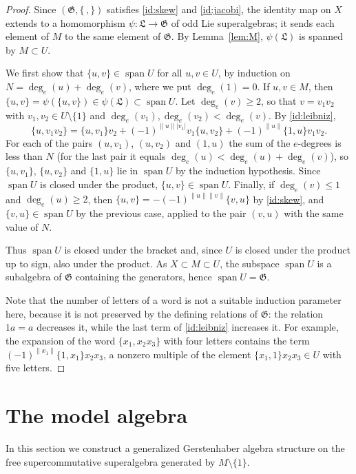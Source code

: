 \documentclass[11pt,reqno]{amsart}
\newcommand{\G}{\mathfrak G}
\newcommand{\LL}{\mathfrak L}
\newcommand{\rp}[1]{\|#1\|}
\DeclareMathOperator{\spn}{span}
\theoremstyle{plain}
\theoremstyle{definition}
\theoremstyle{remark}
\begin{document}
\begin{proof}
Since $(\G,\{\,,\})$ satisfies \eqref{id:skew} and \eqref{id:jacobi}, the identity map on $X$ extends to a homomorphism $\psi\colon\LL\to\G$ of odd Lie superalgebras; it sends each element of $M$ to the same element of $\G$.
By Lemma~\ref{lem:M}, $\psi(\LL)$ is spanned by $M\subset U$.

We first show that $\{u,v\}\in\spn U$ for all $u,v\in U$, by induction on $N=\deg_e(u)+\deg_e(v)$, where we put $\deg_e(1)=0$.
If $u,v\in M$, then $\{u,v\}=\psi(\{u,v\})\in\psi(\LL)\subset\spn U$.
Let $\deg_e(v)\ge2$, so that $v=v_1v_2$ with $v_1,v_2\in U\setminus\{1\}$ and $\deg_e(v_1),\deg_e(v_2)<\deg_e(v)$.
By \eqref{id:leibniz},
$$
\{u,v_1v_2\}=\{u,v_1\}v_2+(-1)^{\rp u|v_1|}v_1\{u,v_2\}+(-1)^{\rp u}\{1,u\}v_1v_2 .
$$
For each of the pairs $(u,v_1)$, $(u,v_2)$ and $(1,u)$ the sum of the $e$-degrees is less than $N$ (for the last pair it equals $\deg_e(u)<\deg_e(u)+\deg_e(v)$), so $\{u,v_1\}$, $\{u,v_2\}$ and $\{1,u\}$ lie in $\spn U$ by the induction hypothesis.
Since $\spn U$ is closed under the product, $\{u,v\}\in\spn U$.
Finally, if $\deg_e(v)\le1$ and $\deg_e(u)\ge2$, then $\{u,v\}=-(-1)^{\rp u\rp v}\{v,u\}$ by \eqref{id:skew}, and $\{v,u\}\in\spn U$ by the previous case, applied to the pair $(v,u)$ with the same value of $N$.

Thus $\spn U$ is closed under the bracket and, since $U$ is closed under the product up to sign, also under the product.
As $X\subset M\subset U$, the subspace $\spn U$ is a subalgebra of $\G$ containing the generators, hence $\spn U=\G$.

Note that the number of letters of a word is not a suitable induction parameter here, because it is not preserved by the defining relations of $\G$: the relation $1a=a$ decreases it, while the last term of \eqref{id:leibniz} increases it.
For example, the expansion of the word $\{x_1,x_2x_3\}$ with four letters contains the term $(-1)^{\rp{x_1}}\{1,x_1\}x_2x_3$, a nonzero multiple of the element $\{x_1,1\}x_2x_3\in U$ with five letters.
\end{proof}

\section{The model algebra}\label{sec:model}

In this section we construct a generalized Gerstenhaber algebra structure on the free supercommutative superalgebra generated by $M\setminus\{1\}$.
\end{document}
